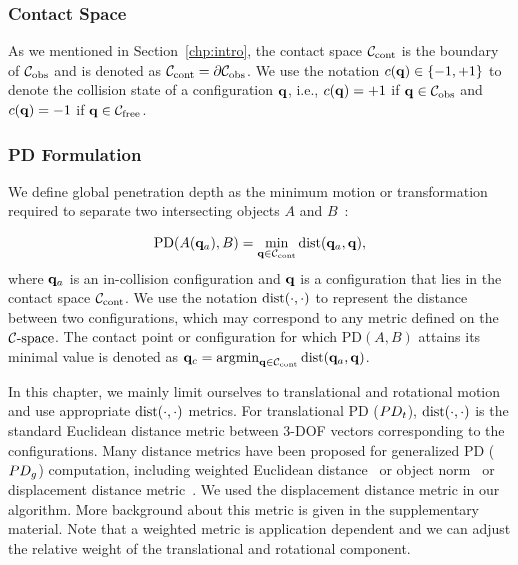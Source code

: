 \subsubsection{Contact Space}
As we mentioned in Section~\ref{chp:intro}, the contact space $\mathcal C_\text{cont}$ is the boundary of $\mathcal C_{\text{obs}}$ and is denoted as $\mathcal C_\text{cont} =\partial \mathcal C_{\text{obs}}$. We use the notation $c(\mathbf q) \in \{-1,+1\}$ to denote the collision state of a configuration $\mathbf q$, i.e., $c(\mathbf q)=+1$ if $\mathbf q \in \mathcal C_{\text{obs}}$ and $c(\mathbf q)=-1$ if $\mathbf q \in \mathcal C_{\text{free}}$.

\subsubsection{PD Formulation}
We define global penetration depth as the minimum motion or transformation required to separate two intersecting objects $A$ and $B$~\cite{Agarwal:2000:CPD,Kim:2002:DEEP}:

\begin{align}
\label{eq:2:PDgdef} \text{PD}(A(\mathbf q_a), B) = \min_{\mathbf q \in
\mathcal C_\text{cont}} \operatorname{dist}(\mathbf q_a, \mathbf q),
\end{align}
where $\mathbf q_a$ is an in-collision configuration and $\mathbf q$ is a
configuration that lies in the contact space $\mathcal C_\text{cont}$.
We use the notation $\operatorname{dist}(\cdot, \cdot)$ to represent the distance between two configurations,
which may correspond to any metric defined on the $\mathcal C\text{-space}$. The
contact point or configuration for which PD$(A, B)$ attains its
minimal value is denoted as $\mathbf q_c = \operatorname{argmin}_{\mathbf q
\in \mathcal C_\text{cont}} \operatorname{dist}(\mathbf q_a, \mathbf q)$.

In this chapter, we mainly limit ourselves to translational and rotational motion and
use appropriate $\operatorname{dist}(\cdot,\cdot)$ metrics.
For translational PD ($PD_t$), $\operatorname{dist}(\cdot, \cdot)$ is the standard Euclidean distance metric between 3-DOF vectors corresponding to the configurations. Many distance metrics have been proposed for generalized PD ($PD_g$) computation, including weighted Euclidean
distance~\cite{Wang:CBO:2012} or object norm~\cite{Je:2012:PRP} or displacement distance metric~\cite{Zhang:2007:AFP}. We used the displacement distance metric in our algorithm. More background about this metric is given in the supplementary material. Note that a weighted metric is application dependent and we can adjust the relative weight of the translational and rotational component.


